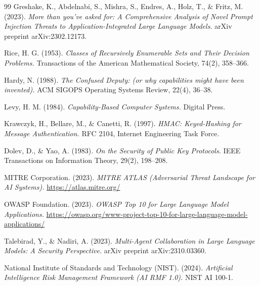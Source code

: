 \documentclass[10pt,a4paper]{article}
\begin{document}
\begin{thebibliography}{99}
Greshake, K., Abdelnabi, S., Mishra, S., Endres, A., Holz, T., \& Fritz, M. (2023). \textit{More than you've asked for: A Comprehensive Analysis of Novel Prompt Injection Threats to Application-Integrated Large Language Models.} arXiv preprint arXiv:2302.12173.

Rice, H. G. (1953). \textit{Classes of Recursively Enumerable Sets and Their Decision Problems.} Transactions of the American Mathematical Society, 74(2), 358--366.

Hardy, N. (1988). \textit{The Confused Deputy: (or why capabilities might have been invented).} ACM SIGOPS Operating Systems Review, 22(4), 36--38.

Levy, H. M. (1984). \textit{Capability-Based Computer Systems.} Digital Press.

Krawczyk, H., Bellare, M., \& Canetti, R. (1997). \textit{HMAC: Keyed-Hashing for Message Authentication.} RFC 2104, Internet Engineering Task Force.

Dolev, D., \& Yao, A. (1983). \textit{On the Security of Public Key Protocols.} IEEE Transactions on Information Theory, 29(2), 198--208.

MITRE Corporation. (2023). \textit{MITRE ATLAS (Adversarial Threat Landscape for AI Systems).} \url{https://atlas.mitre.org/}

OWASP Foundation. (2023). \textit{OWASP Top 10 for Large Language Model Applications.} \url{https://owasp.org/www-project-top-10-for-large-language-model-applications/}

Talebirad, Y., \& Nadiri, A. (2023). \textit{Multi-Agent Collaboration in Large Language Models: A Security Perspective.} arXiv preprint arXiv:2310.03360.

National Institute of Standards and Technology (NIST). (2024). \textit{Artificial Intelligence Risk Management Framework (AI RMF 1.0).} NIST AI 100-1.
\end{thebibliography}
\end{document}

